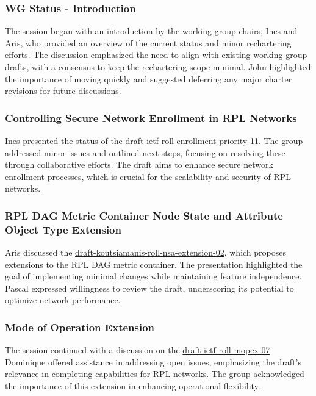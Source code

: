 \documentclass{article}
\begin{document}
\subsubsection{WG Status - Introduction}
The session began with an introduction by the working group chairs, Ines and Aris, who provided an overview of the current status and minor rechartering efforts. The discussion emphasized the need to align with existing working group drafts, with a consensus to keep the rechartering scope minimal. John highlighted the importance of moving quickly and suggested deferring any major charter revisions for future discussions.

\subsubsection{Controlling Secure Network Enrollment in RPL Networks}
Ines presented the status of the \href{https://datatracker.ietf.org/doc/html/draft-ietf-roll-enrollment-priority-11}{draft-ietf-roll-enrollment-priority-11}. The group addressed minor issues and outlined next steps, focusing on resolving these through collaborative efforts. The draft aims to enhance secure network enrollment processes, which is crucial for the scalability and security of RPL networks.

\subsubsection{RPL DAG Metric Container Node State and Attribute Object Type Extension}
Aris discussed the \href{https://datatracker.ietf.org/doc/html/draft-koutsiamanis-roll-nsa-extension-02}{draft-koutsiamanis-roll-nsa-extension-02}, which proposes extensions to the RPL DAG metric container. The presentation highlighted the goal of implementing minimal changes while maintaining feature independence. Pascal expressed willingness to review the draft, underscoring its potential to optimize network performance.

\subsubsection{Mode of Operation Extension}
The session continued with a discussion on the \href{https://datatracker.ietf.org/doc/html/draft-ietf-roll-mopex-07}{draft-ietf-roll-mopex-07}. Dominique offered assistance in addressing open issues, emphasizing the draft's relevance in completing capabilities for RPL networks. The group acknowledged the importance of this extension in enhancing operational flexibility.
\end{document}
